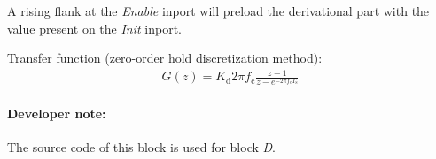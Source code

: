 %
%
%
%
%
%
%
%
A rising flank at the \textit{Enable} inport will preload the derivational part with the value present on the \textit{Init} inport.
\newline

Transfer function (zero-order hold discretization method):
\begin{eqnarray*}
	G(z) = K_{\mathrm{d}}2 \pi f_{\mathrm{c}}\frac{z-1}{z-e^{-2 \pi f_{\mathrm{c}} T_{\mathrm{s}}}}
\end{eqnarray*}

\paragraph{Developer note:} The source code of this block is used for block \textit{D}.
